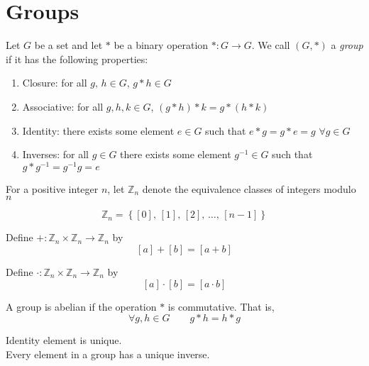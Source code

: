 \section{Groups}
\begin{definition}
    Let $G$ be a set and let $*$ be a binary operation $*:G\to G$. We call $(G, *)$ a \emph{group} if it has the following properties:
    \begin{enumerate}
        \item Closure: for all $g,\,h\in G,\, g*h\in G$
        \item Associative: for all $g,h,k\in G$, $(g*h)*k = g*(h*k)$
        \item Identity: there exists some element $e\in G$ such that $e*g = g*e = g$ $\forall g\in G$
        \item Inverses: for all $g\in G$ there exists some element $g^{-1}\in G$ such that $g*g^{-1} = g^{-1}g = e$
    \end{enumerate}
\end{definition}

\begin{definition}
    For a positive integer $n$, let $\mathbb Z_n$ denote the equivalence classes of integers modulo $n$

    $$\mathbb Z_n = \left\{[0],\,[1],\,[2],\,\dots,\,[n-1]\right\}$$

    Define $+:\mathbb Z_n \times \mathbb Z_n \to \mathbb Z_n$ by $$[a] + [b] = [a+b]$$

    Define $\cdot:\mathbb Z_n \times \mathbb Z_n \to \mathbb Z_n$ by $$[a] \cdot [b] = [a\cdot b]$$
\end{definition}
\begin{definition}
    A group is abelian if the operation \(*\) is commutative. That is,
    \[\forall g, h\in G \qquad g*h = h*g\]
\end{definition}
\begin{theorm}
    Identity element is unique.\\
    Every element in a group has a unique inverse.
\end{theorm}\newpage

